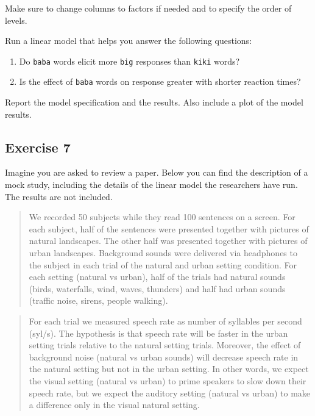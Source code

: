 \documentclass[
]{article}
\providecommand{\tightlist}{%
  \setlength{\itemsep}{0pt}\setlength{\parskip}{0pt}}
\begin{document}
Make sure to change columns to factors if needed and to specify the
order of levels.

Run a linear model that helps you answer the following questions:

\begin{enumerate}
\def\labelenumi{\arabic{enumi}.}
\tightlist
\item
  Do \texttt{baba} words elicit more \texttt{big} responses than
  \texttt{kiki} words?
\item
  Is the effect of \texttt{baba} words on response greater with shorter
  reaction times?
\end{enumerate}

Report the model specification and the results. Also include a plot of
the model results.

\hypertarget{exercise-7}{%
\subsection{Exercise 7}\label{exercise-7}}

Imagine you are asked to review a paper. Below you can find the
description of a mock study, including the details of the linear model
the researchers have run. The results are not included.

\begin{quote}
We recorded 50 subjects while they read 100 sentences on a screen. For
each subject, half of the sentences were presented together with
pictures of natural landscapes. The other half was presented together
with pictures of urban landscapes. Background sounds were delivered via
headphones to the subject in each trial of the natural and urban setting
condition. For each setting (natural vs urban), half of the trials had
natural sounds (birds, waterfalls, wind, waves, thunders) and half had
urban sounds (traffic noise, sirens, people walking).
\end{quote}

\begin{quote}
For each trial we measured speech rate as number of syllables per second
(syl/s). The hypothesis is that speech rate will be faster in the urban
setting trials relative to the natural setting trials. Moreover, the
effect of background noise (natural vs urban sounds) will decrease
speech rate in the natural setting but not in the urban setting. In
other words, we expect the visual setting (natural vs urban) to prime
speakers to slow down their speech rate, but we expect the auditory
setting (natural vs urban) to make a difference only in the visual
natural setting.
\end{quote}
\end{document}
